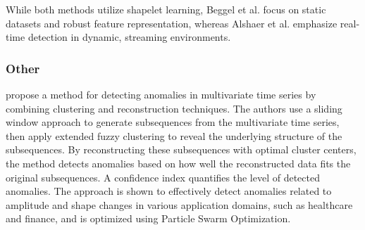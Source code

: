 While both methods utilize shapelet learning, Beggel et al. focus on static datasets and robust feature representation, whereas Alshaer et al. emphasize real-time detection in dynamic, streaming environments.

\cite{liang_shapelet-based_2024}

\cite{li_ips_2022}

\subsubsection{Other}
\cite{li_clustering-based_2021} propose a method for detecting anomalies in multivariate time series by combining clustering and reconstruction techniques. The authors use a sliding window approach to generate subsequences from the multivariate time series, then apply extended fuzzy clustering to reveal the underlying structure of the subsequences. By reconstructing these subsequences with optimal cluster centers, the method detects anomalies based on how well the reconstructed data fits the original subsequences. A confidence index quantifies the level of detected anomalies. The approach is shown to effectively detect anomalies related to amplitude and shape changes in various application domains, such as healthcare and finance, and is optimized using Particle Swarm Optimization.


\cite{niu_lstm-based_2020}
\cite{duan_unsupervised_2021}
